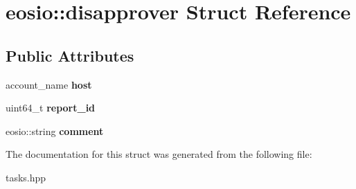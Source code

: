 \hypertarget{structeosio_1_1disapprover}{}\section{eosio\+:\+:disapprover Struct Reference}
\label{structeosio_1_1disapprover}
\subsection*{Public Attributes}
\begin{DoxyCompactItemize}
\item 
\mbox{\label{structeosio_1_1disapprover_a7b6275edfad8da33c6cfc4b1f4f4a43f}} 
account\+\_\+name {\bfseries host}
\item 
\mbox{\label{structeosio_1_1disapprover_a8814983180e5728894750077185bf2d6}} 
uint64\+\_\+t {\bfseries report\+\_\+id}
\item 
\mbox{\label{structeosio_1_1disapprover_a52ec318f875e215f537e2e8a51912cec}} 
eosio\+::string {\bfseries comment}
\end{DoxyCompactItemize}


The documentation for this struct was generated from the following file\+:\begin{DoxyCompactItemize}
\item 
tasks.\+hpp\end{DoxyCompactItemize}
